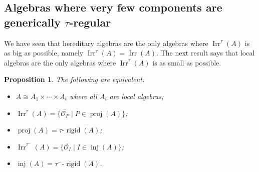 \documentclass[12pt,reqno]{amsart}
\newtheorem{Prop}[Thm]{Proposition}
\theoremstyle{definition}
\newcommand{\cO}{{\mathcal O}}
\newcommand{\proj}{\operatorname{proj}}
\newcommand{\inj}{\operatorname{inj}}
\newcommand{\rigid}{\operatorname{rigid}}
\newcommand{\irr}{\operatorname{Irr}}
\begin{document}
\subsection{Algebras where very few components are generically
$\tau$-regular}\label{subsec:fewtaureg}
We have seen that hereditary algebras are the only algebras
where $\irr^\tau(A)$ is as big as possible, namely
$\irr^\tau(A) = \irr(A)$.
The next result says that local algebras are the only algebras where
$\irr^\tau(A)$ is as small as possible.


\begin{Prop}\label{prop:local}
The following are equivalent:
\begin{itemize}\itemsep2mm

\item[(i)]
$A \cong A_1 \times \cdots \times A_t$ where all
$A_i$ are local algebras;

\item[(ii)]
$\irr^\tau(A) = \{ \overline{\cO_P} \mid P \in \proj(A) \}$;

\item[(iii)]
$\proj(A) = \text{$\tau$-$\rigid(A)$}$;

\item[(iv)]
$\irr^{\tau^-}(A) = \{ \overline{\cO_I} \mid I \in \inj(A) \}$;

\item[(v)]
$\inj(A) = \text{$\tau^-$-$\rigid(A)$}$.

\end{itemize}
\end{Prop}
\end{document}
